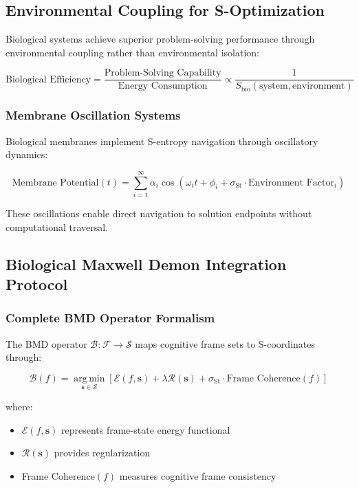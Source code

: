 \documentclass[11pt]{article}
\theoremstyle{definition}
\theoremstyle{remark}
\DeclareMathOperator{\argmin}{arg\,min}
\newcommand{\SEntropy}{\mathcal{S}}
\newcommand{\Frame}{\mathcal{F}}
\newcommand{\Energy}{\mathcal{E}}
\newcommand{\StellasConstant}{\sigma_{\text{St}}}
\begin{document}
\subsection{Environmental Coupling for S-Optimization}

Biological systems achieve superior problem-solving performance through environmental coupling rather than environmental isolation:

\begin{equation}
\text{Biological Efficiency} = \frac{\text{Problem-Solving Capability}}{\text{Energy Consumption}} \propto \frac{1}{S_{\text{bio}}(\text{system}, \text{environment})}
\end{equation}

\subsubsection{Membrane Oscillation Systems}

Biological membranes implement S-entropy navigation through oscillatory dynamics:

\begin{equation}
\text{Membrane Potential}(t) = \sum_{i=1}^{\infty} \alpha_i \cos(\omega_i t + \phi_i + \StellasConstant \cdot \text{Environment Factor}_i)
\end{equation}

These oscillations enable direct navigation to solution endpoints without computational traversal.

\subsection{Biological Maxwell Demon Integration Protocol}

\subsubsection{Complete BMD Operator Formalism}

The BMD operator $\mathcal{B}: \Frame \to \SEntropy$ maps cognitive frame sets to S-coordinates through:

\begin{equation}
\mathcal{B}(f) = \underset{\mathbf{s} \in \SEntropy}{\argmin} \left[ \Energy(f, \mathbf{s}) + \lambda \mathcal{R}(\mathbf{s}) + \StellasConstant \cdot \text{Frame Coherence}(f) \right]
\end{equation}

where:
\begin{itemize}
\item $\Energy(f, \mathbf{s})$ represents frame-state energy functional
\item $\mathcal{R}(\mathbf{s})$ provides regularization
\item Frame Coherence$(f)$ measures cognitive frame consistency
\end{itemize}
\end{document}
